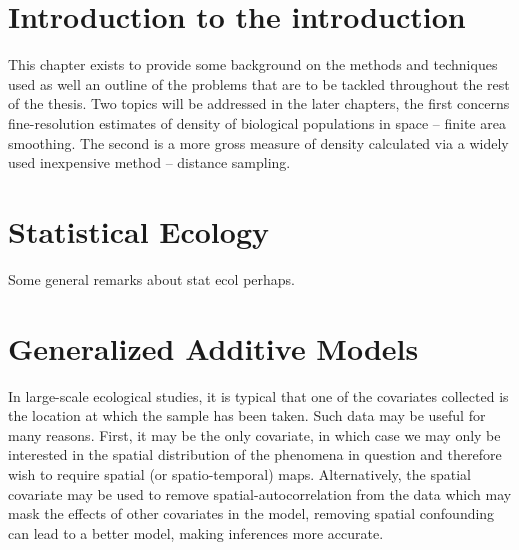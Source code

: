 \label{chap-intro}


\section{Introduction to the introduction}

This chapter exists to provide some background on the methods and techniques used as well an outline of the problems that are to be tackled throughout the rest of the thesis. Two topics will be addressed in the later chapters, the first concerns fine-resolution estimates of density of biological populations in space -- finite area smoothing. The second is a more gross measure of density calculated via a widely used inexpensive method -- distance sampling.

\section{Statistical Ecology}

Some general remarks about stat ecol perhaps.

%
%



\section{Generalized Additive Models}

In large-scale ecological studies, it is typical that one of the covariates collected is the location at which the sample has been taken. Such data may be useful for many reasons. First, it may be the only covariate, in which case we may only be interested in the spatial distribution of the phenomena in question and therefore wish to require spatial (or spatio-temporal) maps. Alternatively, the spatial covariate may be used to remove spatial-autocorrelation from the data which may mask the effects of other covariates in the model, removing spatial confounding can lead to a better model, making inferences more accurate.

